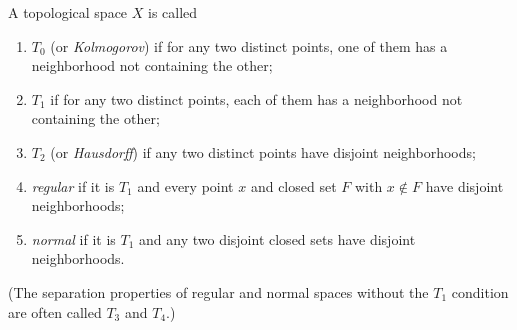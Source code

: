 \begin{defn}
    A topological space $X$ is called
    \begin{enumerate}
        \item $T_0$ (or \emph{Kolmogorov}) if for any two distinct points, one of them has a neighborhood not containing the other;
        \item $T_1$ if for any two distinct points, each of them has a neighborhood not containing the other;
        \item $T_2$ (or \emph{Hausdorff}) if any two distinct points have disjoint neighborhoods;
        \item \emph{regular} if it is $T_1$ and every point $x$ and closed set $F$ with $x\notin F$ have disjoint neighborhoods;
        \item \emph{normal} if it is $T_1$ and any two disjoint closed sets have disjoint neighborhoods.
    \end{enumerate}
    (The separation properties of regular and normal spaces without the $T_1$ condition are often called $T_3$ and $T_4$.)
\end{defn}


